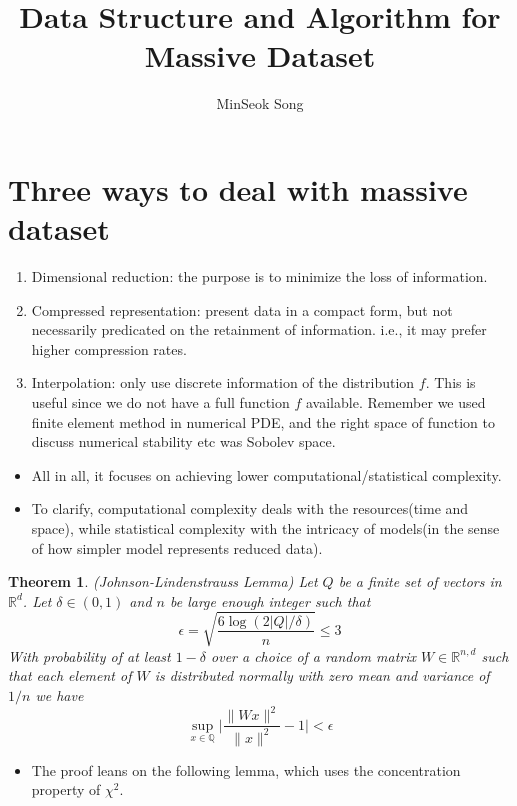 \documentclass[11pt,reqno]{amsart}
\title{Data Structure and Algorithm for Massive Dataset}
\author{MinSeok Song}
\date{}
\newtheorem{theorem}{Theorem}
\theoremstyle{remark}
\begin{document}
\maketitle
\section*{Three ways to deal with massive dataset}
\begin{enumerate}
\item Dimensional reduction: the purpose is to minimize the loss of information.
\item Compressed representation: present data in a compact form, but not necessarily predicated on the retainment 
of information. i.e., it may prefer higher compression rates.
\item Interpolation: only use discrete information of the distribution $f$. 
This is useful since we do not have a full function $f$ available. Remember we 
used finite element method in numerical PDE, and the right space of function to discuss
 numerical stability etc was Sobolev space.
\end{enumerate}
\begin{itemize}
\item All in all, it focuses on achieving lower computational/statistical complexity.
\item To clarify, computational complexity deals with the resources(time and space), 
while statistical complexity with the intricacy of models(in the sense of how simpler model represents reduced data). 
\end{itemize}
\begin{theorem} (Johnson-Lindenstrauss Lemma)
Let $Q$ be a finite set of vectors in $\mathbb{R}^d$. Let $\delta\in (0,1)$ and $n$ be large enough integer such that
\begin{equation}
\epsilon = \sqrt{\frac{6\log (2\lvert Q\rvert/\delta)}n}\leq 3
\end{equation}
With probability of at least $1-\delta$ over a choice of a random matrix $W\in\mathbb{R}^{n,d}$
 such that each element of $W$ is distributed normally with zero mean and variance of $1/n$ we have
\begin{equation}
\sup_{x\in\mathbb{Q}}\lvert \frac{\lVert Wx\rVert^2}{\lVert x\rVert^2}-1\rvert < \epsilon
\end{equation}
\end{theorem}
\begin{itemize}
\item The proof leans on the following lemma, which uses the concentration property of $\chi^2$.
\end{itemize}
\end{document}

